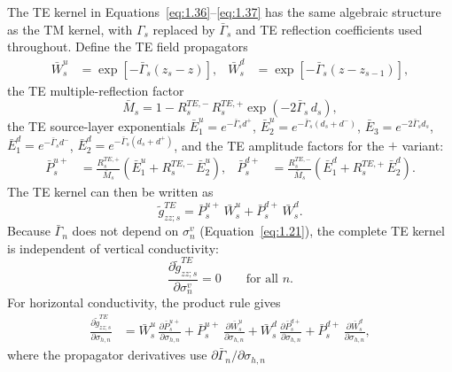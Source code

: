 \documentclass[12pt]{report}
\begin{document}
The TE kernel in Equations~\eqref{eq:1.36}--\eqref{eq:1.37} has the
same algebraic structure as the TM kernel, with \(\Gamma_s\) replaced by
\(\bar\Gamma_s\) and TE reflection coefficients used throughout. Define
the TE field propagators
\begin{align}
    \bar{W}_s^u &= \exp\!\left[-\bar\Gamma_s(z_s - z)\right], &
    \bar{W}_s^d &= \exp\!\left[-\bar\Gamma_s(z - z_{s-1})\right],
    \label{eq:1.81}
\end{align}
the TE multiple-reflection factor
\begin{equation}
    \bar{M}_s = 1 - R_s^{TE,-}\,R_s^{TE,+}\exp(-2\bar\Gamma_s\,d_s),
    \label{eq:1.82}
\end{equation}
the TE source-layer exponentials \(\bar{E}_1^u = e^{-\bar\Gamma_s d^+}\),
\(\bar{E}_2^u = e^{-\bar\Gamma_s(d_s+d^-)}\), \(\bar{E}_3 = e^{-2\bar\Gamma_s d_s}\),
\(\bar{E}_1^d = e^{-\bar\Gamma_s d^-}\), \(\bar{E}_2^d = e^{-\bar\Gamma_s(d_s+d^+)}\),
and the TE amplitude factors for the \(+\) variant:
\begin{align}
    \bar{P}_s^{u+}
    &= \frac{R_s^{TE,+}}{\bar{M}_s}
       \!\left(\bar{E}_1^u + R_s^{TE,-}\,\bar{E}_2^u\right), &
    \bar{P}_s^{d+}
    &= \frac{R_s^{TE,-}}{\bar{M}_s}
       \!\left(\bar{E}_1^d + R_s^{TE,+}\,\bar{E}_2^d\right).
    \label{eq:1.83}
\end{align}
The TE kernel can then be written as
\begin{equation}
    \tilde{g}^{TE}_{zz;s} = \bar{P}_s^{u+}\,\bar{W}_s^u + \bar{P}_s^{d+}\,\bar{W}_s^d.
    \label{eq:1.84}
\end{equation}
Because \(\bar\Gamma_n\) does not depend on \(\sigma_n^v\)
(Equation~\eqref{eq:1.21}), the complete TE kernel is independent of
vertical conductivity:
\begin{equation}
    \frac{\partial\tilde{g}^{TE}_{zz;s}}{\partial\sigma^v_n} = 0
    \qquad\text{for all }n.
    \label{eq:1.85}
\end{equation}
For horizontal conductivity, the product rule gives
\begin{align}
    \frac{\partial\tilde{g}^{TE}_{zz;s}}{\partial\sigma_{h,n}}
    &= \bar{W}_s^u\,\frac{\partial\bar{P}_s^{u+}}{\partial\sigma_{h,n}}
     + \bar{P}_s^{u+}\,\frac{\partial\bar{W}_s^u}{\partial\sigma_{h,n}}
     + \bar{W}_s^d\,\frac{\partial\bar{P}_s^{d+}}{\partial\sigma_{h,n}}
     + \bar{P}_s^{d+}\,\frac{\partial\bar{W}_s^d}{\partial\sigma_{h,n}},
    \label{eq:1.86}
\end{align}
where the propagator derivatives use \(\partial\bar\Gamma_n/\partial\sigma_{h,n}\)
\end{document}
